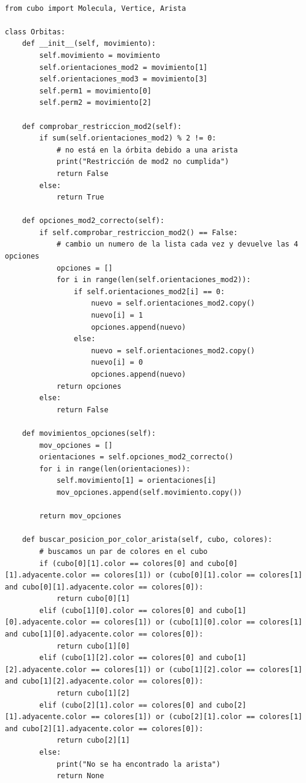 \begin{lstlisting}

from cubo import Molecula, Vertice, Arista

class Orbitas:
    def __init__(self, movimiento):
        self.movimiento = movimiento
        self.orientaciones_mod2 = movimiento[1]
        self.orientaciones_mod3 = movimiento[3]
        self.perm1 = movimiento[0]
        self.perm2 = movimiento[2]

    def comprobar_restriccion_mod2(self):
        if sum(self.orientaciones_mod2) % 2 != 0:
            # no está en la órbita debido a una arista
            print("Restricción de mod2 no cumplida")
            return False
        else:
            return True

    def opciones_mod2_correcto(self):
        if self.comprobar_restriccion_mod2() == False:
            # cambio un numero de la lista cada vez y devuelve las 4 opciones
            opciones = []
            for i in range(len(self.orientaciones_mod2)):
                if self.orientaciones_mod2[i] == 0:
                    nuevo = self.orientaciones_mod2.copy()
                    nuevo[i] = 1
                    opciones.append(nuevo)
                else:
                    nuevo = self.orientaciones_mod2.copy()
                    nuevo[i] = 0
                    opciones.append(nuevo)
            return opciones
        else:
            return False

    def movimientos_opciones(self):
        mov_opciones = []
        orientaciones = self.opciones_mod2_correcto()
        for i in range(len(orientaciones)):
            self.movimiento[1] = orientaciones[i]
            mov_opciones.append(self.movimiento.copy())            

        return mov_opciones
    
    def buscar_posicion_por_color_arista(self, cubo, colores):
        # buscamos un par de colores en el cubo
        if (cubo[0][1].color == colores[0] and cubo[0][1].adyacente.color == colores[1]) or (cubo[0][1].color == colores[1] and cubo[0][1].adyacente.color == colores[0]):
            return cubo[0][1]
        elif (cubo[1][0].color == colores[0] and cubo[1][0].adyacente.color == colores[1]) or (cubo[1][0].color == colores[1] and cubo[1][0].adyacente.color == colores[0]): 
            return cubo[1][0]
        elif (cubo[1][2].color == colores[0] and cubo[1][2].adyacente.color == colores[1]) or (cubo[1][2].color == colores[1] and cubo[1][2].adyacente.color == colores[0]):
            return cubo[1][2]
        elif (cubo[2][1].color == colores[0] and cubo[2][1].adyacente.color == colores[1]) or (cubo[2][1].color == colores[1] and cubo[2][1].adyacente.color == colores[0]):
            return cubo[2][1]
        else:
            print("No se ha encontrado la arista")
            return None
        

\end{lstlisting}
